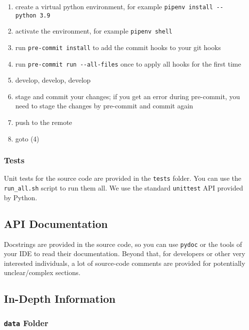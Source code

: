 \documentclass[
]{article}
\providecommand{\tightlist}{%
  \setlength{\itemsep}{0pt}\setlength{\parskip}{0pt}}
\begin{document}
\begin{enumerate}
\def\labelenumi{\arabic{enumi}.}
\tightlist
\item
  create a virtual python environment, for example
  \texttt{pipenv\ install\ -\/-python\ 3.9}
\item
  activate the environment, for example \texttt{pipenv\ shell}
\item
  run \texttt{pre-commit\ install} to add the commit hooks to your git
  hooks
\item
  run \texttt{pre-commit\ run\ -\/-all-files} once to apply all hooks
  for the first time
\item
  develop, develop, develop
\item
  stage and commit your changes; if you get an error during pre-commit,
  you need to stage the changes by pre-commit and commit again
\item
  push to the remote
\item
  goto (4)
\end{enumerate}

\hypertarget{tests}{%
\subsubsection{Tests}\label{tests}}

Unit tests for the source code are provided in the \texttt{tests}
folder. You can use the \texttt{run\_all.sh} script to run them all. We
use the standard \texttt{unittest} API provided by Python.

\hypertarget{api-documentation}{%
\subsection{API Documentation}\label{api-documentation}}

Docstrings are provided in the source code, so you can use
\texttt{pydoc} or the tools of your IDE to read their documentation.
Beyond that, for developers or other very interested individuals, a lot
of source-code comments are provided for potentially unclear/complex
sections.

\hypertarget{in-depth-information}{%
\subsection{In-Depth Information}\label{in-depth-information}}

\hypertarget{data-folder}{%
\subsubsection{\texorpdfstring{\texttt{data}
Folder}{data Folder}}\label{data-folder}}
\end{document}
